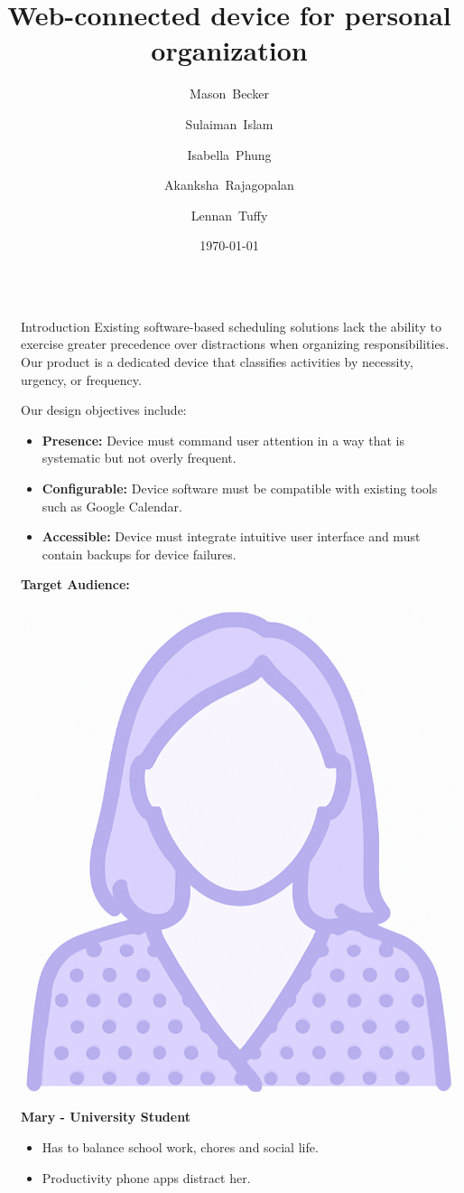 \documentclass[final]{beamer}
\title{Web-connected device for personal organization}
\author{
  Mason~Becker
  \and
  Sulaiman~Islam
  \and
  Isabella~Phung
  \and
  Akanksha~Rajagopalan
  \and
  Lennan~Tuffy
}
\institute[UC Santa Cruz]{CSE 123 - Supervised by Prof. David Harrison and Charlie Alders}
\date{\today}
\newlength{\sepwidth}
\newlength{\colwidth}
\newcommand{\separatorcolumn}{\begin{column}{\sepwidth}\end{column}}
\begin{document}
\begin{frame}[t]
  \begin{columns}[t]
    \separatorcolumn

    \begin{column}{\colwidth}

      \begin{block}{Introduction}
        Existing software-based scheduling solutions lack the ability to exercise 
        greater precedence over distractions when organizing responsibilities. Our product is a dedicated device that classifies activities by necessity, urgency, or frequency.

        Our design objectives include:
        \begin{itemize}
            \item \textbf{Presence:} Device must command user attention in a way that is systematic but not overly frequent.
            \item \textbf{Configurable:} Device software must be compatible with existing tools such as Google Calendar.
            \item \textbf{Accessible:} Device must integrate intuitive user interface and must contain backups for device failures. 
        \end{itemize}
       
        \textbf{Target Audience:}
        \newline
        \newline
        \noindent\begin{minipage}{0.3\linewidth}
        \centering
        \includegraphics[width=0.5\linewidth]{Camillia.png}
        \end{minipage}
        \hfill
        \begin{minipage}{0.7\linewidth}
          \textbf{Mary - University Student}
        \begin{itemize}
            \item Has to balance school work, chores and social life.
            \item Productivity phone apps distract her.
        \end{itemize}
        \end{minipage}


\end{block}
\end{column}
\end{columns}
\end{frame}
\end{document}

